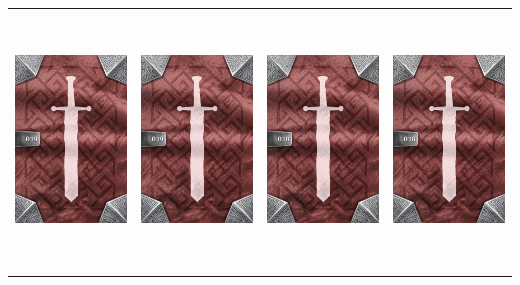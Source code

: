 \documentclass{minimal}
\begin{document}
{\begin{longtable}{llll}
\includegraphics[width=44mm,height=68mm]{./15-21/gh-019-weighted-net-back.png} &
\includegraphics[width=44mm,height=68mm]{./15-21/gh-019-weighted-net-back.png} &
\includegraphics[width=44mm,height=68mm]{./15-21/gh-018-battle-axe-back.png} &
\includegraphics[width=44mm,height=68mm]{./15-21/gh-018-battle-axe-back.png}\\ 

\end{longtable}}
\end{document}
